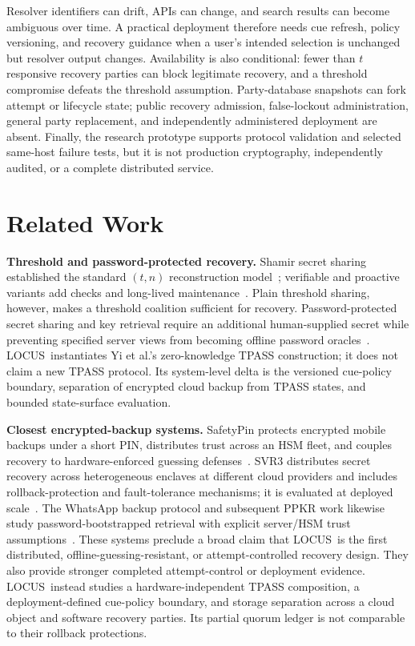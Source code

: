 \documentclass[sigconf,anonymous]{acmart}
\newcounter{protocol}
\newcommand{\LOCUS}{\textsf{LOCUS}}
\begin{document}
Resolver identifiers can drift, APIs can change, and search results can become ambiguous over time. A practical deployment therefore needs cue refresh, policy versioning, and recovery guidance when a user's intended selection is unchanged but resolver output changes. Availability is also conditional: fewer than \(t\) responsive recovery parties can block legitimate recovery, and a threshold compromise defeats the threshold assumption. Party-database snapshots can fork attempt or lifecycle state; public recovery admission, false-lockout administration, general party replacement, and independently administered deployment are absent. Finally, the research prototype supports protocol validation and selected same-host failure tests, but it is not production cryptography, independently audited, or a complete distributed service.

\section{Related Work}
\label{sec:related-work}

\textbf{Threshold and password-protected recovery.}
Shamir secret sharing established the standard \((t,n)\) reconstruction
model~\cite{Shamir1979}; verifiable and proactive variants add checks and
long-lived maintenance~\cite{Feldman1987,PVSS1999,AVSS2002}. Plain threshold
sharing, however, makes a threshold coalition sufficient for recovery.
Password-protected secret sharing and key retrieval require an additional
human-supplied secret while preventing specified server views from becoming
offline password oracles~\cite{Bagherzandi2011PPSS,Jarecki2014PPSS,PPSS2016,Camenisch2014Memento,Yi2015TPASS,Yi2019TPASS,PPKR2024}. \LOCUS\
instantiates Yi et al.'s zero-knowledge TPASS construction; it does not claim a
new TPASS protocol. Its system-level delta is the versioned cue-policy boundary,
separation of encrypted cloud backup from TPASS states, and bounded
state-surface evaluation.

\textbf{Closest encrypted-backup systems.}
SafetyPin protects encrypted mobile backups under a short PIN, distributes
trust across an HSM fleet, and couples recovery to hardware-enforced
guessing defenses~\cite{SafetyPin2020}. SVR3 distributes secret recovery across
heterogeneous enclaves at different cloud providers and includes
rollback-protection and fault-tolerance mechanisms; it is evaluated at deployed
scale~\cite{SVR3_2024}. The WhatsApp backup protocol and subsequent PPKR work
likewise study password-bootstrapped retrieval with explicit server/HSM trust
assumptions~\cite{WhatsAppBackup2023,PPKR2024}. These systems preclude a broad
claim that \LOCUS\ is the first distributed, offline-guessing-resistant, or
attempt-controlled recovery design. They also provide stronger completed
attempt-control or deployment evidence. \LOCUS\ instead studies a
hardware-independent TPASS composition, a deployment-defined cue-policy boundary,
and storage separation across a cloud object and software recovery parties. Its
partial quorum ledger is not comparable to their rollback protections.
\end{document}
